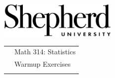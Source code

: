 \documentclass[10pt]{article}
\begin{document}
\pagestyle{empty}

\href{http://www.shepherd.edu}{\includegraphics[height=1.75cm]{logo-high-res.eps}}
\vspace{-1.69cm}

{\small
\begin{tabular}{cl}
\hspace{5in} & Math 314:  Statistics\\
                & Warmup Exercises\\
                & %
\end{tabular}
}
\medskip
\end{document}
